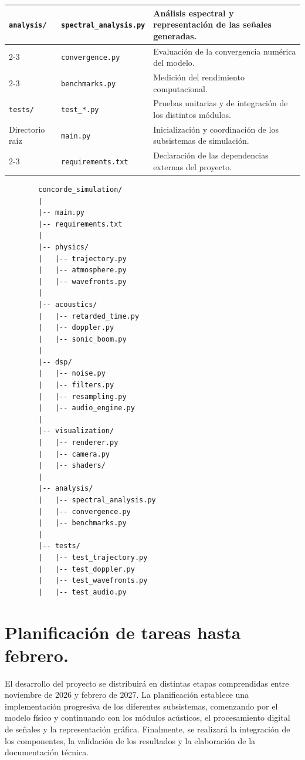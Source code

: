 \documentclass[10.5pt]{article}
\begin{document}
\begin{table}[H]
\begin{tabular}{|l|p{4cm}|p{10cm}|}
			\hline
			\texttt{analysis/} &
			\texttt{spectral\_analysis.py} &
			Análisis espectral y representación de las señales generadas. \\
			\cline{2-3}
			&
			\texttt{convergence.py} &
			Evaluación de la convergencia numérica del modelo. \\
			\cline{2-3}
			&
			\texttt{benchmarks.py} &
			Medición del rendimiento computacional. \\
			\hline
			\texttt{tests/} &
			\texttt{test\_*.py} &
			Pruebas unitarias y de integración de los distintos módulos. \\
			\hline
			Directorio raíz &
			\texttt{main.py} &
			Inicialización y coordinación de los subsistemas de simulación. \\
			\cline{2-3}
			&
			\texttt{requirements.txt} &
			Declaración de las dependencias externas del proyecto. \\
			\hline
		\end{tabular}
		
	\end{table}
	
	\newpage
	\begin{verbatim}
		concorde_simulation/
		|
		|-- main.py
		|-- requirements.txt
		|
		|-- physics/
		|   |-- trajectory.py
		|   |-- atmosphere.py
		|   |-- wavefronts.py
		|
		|-- acoustics/
		|   |-- retarded_time.py
		|   |-- doppler.py
		|   |-- sonic_boom.py
		|
		|-- dsp/
		|   |-- noise.py
		|   |-- filters.py
		|   |-- resampling.py
		|   |-- audio_engine.py
		|
		|-- visualization/
		|   |-- renderer.py
		|   |-- camera.py
		|   |-- shaders/
		|
		|-- analysis/
		|   |-- spectral_analysis.py
		|   |-- convergence.py
		|   |-- benchmarks.py
		|
		|-- tests/
		|   |-- test_trajectory.py
		|   |-- test_doppler.py
		|   |-- test_wavefronts.py
		|   |-- test_audio.py
	\end{verbatim}
	
	\newpage 
	
	\section{Planificación de tareas hasta febrero.}
	
	El desarrollo del proyecto se distribuirá en distintas etapas comprendidas entre noviembre de 2026 y febrero de 2027. La planificación establece una implementación progresiva de los diferentes subsistemas, comenzando por el modelo físico y continuando con los módulos acústicos, el procesamiento digital de señales y la representación gráfica. Finalmente, se realizará la integración de los componentes, la validación de los resultados y la elaboración de la documentación técnica.
	
\end{document}
